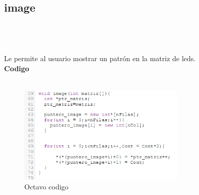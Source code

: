 \documentclass{article}
\begin{document}
\subsection{\large image}\\\\
\\
Le permite al usuario mostrar un patrón en la matriz de leds.\\

\textbf{\large Codigo}\\\\
\begin{figure}[h]
    \includegraphics[width=8cm]{Imagen10.png}
    \centering
    \caption{Octavo codigo}
    \label{fig:Imagen9}
\end{figure}\\\\


\newpage



\end{document}
